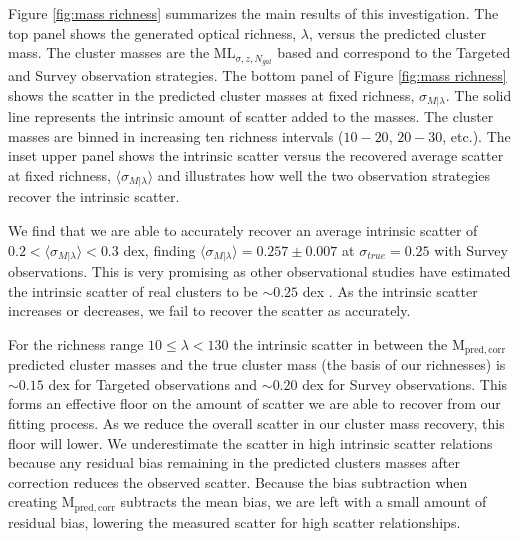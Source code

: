 \documentclass[fleqn,usenatbib]{mnras}
\begin{document}
Figure \ref{fig:mass richness} summarizes the main results of this investigation. The top panel shows the generated optical richness, $\lambda$, versus the predicted cluster mass. The cluster masses are the $\mathrm{ML}_{\sigma, z, N_{gal}}$ based and correspond to the Targeted and Survey observation strategies. The bottom panel of Figure \ref{fig:mass richness} shows the scatter in the predicted cluster masses at fixed richness, $\sigma_{M|\lambda}$. The solid line represents the intrinsic amount of scatter added to the masses. The cluster masses are binned in increasing ten richness intervals ($10-20$, $20-30$, etc.). The inset upper panel shows the intrinsic scatter versus the recovered average scatter at fixed richness, $\langle \sigma_{M|\lambda} \rangle$ and illustrates how well the two observation strategies recover the intrinsic scatter. 

We find that we are able to accurately recover an average intrinsic scatter of $0.2 <\langle \sigma_{M|\lambda} \rangle <0.3$ dex, finding $\langle \sigma_{M|\lambda} \rangle = 0.257\pm0.007$ at $\sigma_{true} = 0.25$ with Survey observations. This is very promising as other observational studies have estimated the intrinsic scatter of real clusters to be $\sim0.25$ dex . As the intrinsic scatter increases or decreases, we fail to recover the scatter as accurately.

For the richness range $10 \leq \lambda < 130$ the intrinsic scatter in between the $\mathrm{M_{pred,corr}}$ predicted cluster masses and the true cluster mass (the basis of our richnesses) is $\sim0.15$ dex for Targeted observations and $\sim0.20$ dex for Survey observations. This forms an effective floor on the amount of scatter we are able to recover from our fitting process. As we reduce the overall scatter in our cluster mass recovery, this floor will lower. We underestimate the scatter in high intrinsic scatter relations because any residual bias remaining in the predicted clusters masses after correction reduces the observed scatter. Because the bias subtraction when creating $\mathrm{M_{pred,corr}}$ subtracts the mean bias, we are left with a small amount of residual bias, lowering the measured scatter for high scatter relationships.
\end{document}
